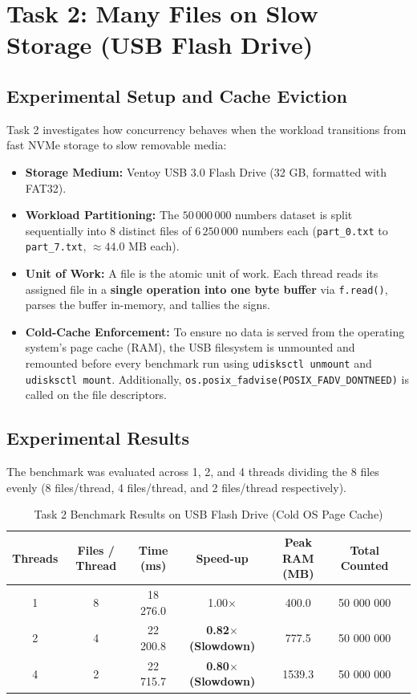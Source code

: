 \documentclass{labreport}
\begin{document}
\newpage

\section{Task 2: Many Files on Slow Storage (USB Flash Drive)}

\subsection{Experimental Setup and Cache Eviction}
Task 2 investigates how concurrency behaves when the workload transitions from fast NVMe storage to slow removable media:
\begin{itemize}
    \item \textbf{Storage Medium:} Ventoy USB 3.0 Flash Drive (32 GB, formatted with FAT32).
    \item \textbf{Workload Partitioning:} The $50\,000\,000$ numbers dataset is split sequentially into 8 distinct files of $6\,250\,000$ numbers each (\texttt{part\_0.txt} to \texttt{part\_7.txt}, $\approx 44.0\text{ MB}$ each).
    \item \textbf{Unit of Work:} A file is the atomic unit of work. Each thread reads its assigned file in a \textbf{single operation into one byte buffer} via \texttt{f.read()}, parses the buffer in-memory, and tallies the signs.
    \item \textbf{Cold-Cache Enforcement:} To ensure no data is served from the operating system's page cache (RAM), the USB filesystem is unmounted and remounted before every benchmark run using \texttt{udisksctl unmount} and \texttt{udisksctl mount}. Additionally, \texttt{os.posix\_fadvise(POSIX\_FADV\_DONTNEED)} is called on the file descriptors.
\end{itemize}

\subsection{Experimental Results}
The benchmark was evaluated across 1, 2, and 4 threads dividing the 8 files evenly (8 files/thread, 4 files/thread, and 2 files/thread respectively).

\begin{table}[H]
\centering
\caption{Task 2 Benchmark Results on USB Flash Drive (Cold OS Page Cache)}
\label{tab:task2_results}
\begin{tabular}{ccccccc}
\toprule
\textbf{Threads} & \textbf{Files / Thread} & \textbf{Time (ms)} & \textbf{Speed-up} & \textbf{Peak RAM (MB)} & \textbf{Total Counted} \\
\midrule
1 & 8 & 18 276.0 & 1.00$\times$ & 400.0 & 50 000 000 \\
2 & 4 & 22 200.8 & \textbf{0.82$\times$ (Slowdown)} & 777.5 & 50 000 000 \\
4 & 2 & 22 715.7 & \textbf{0.80$\times$ (Slowdown)} & 1539.3 & 50 000 000 \\
\bottomrule
\end{tabular}
\end{table}
\end{document}
